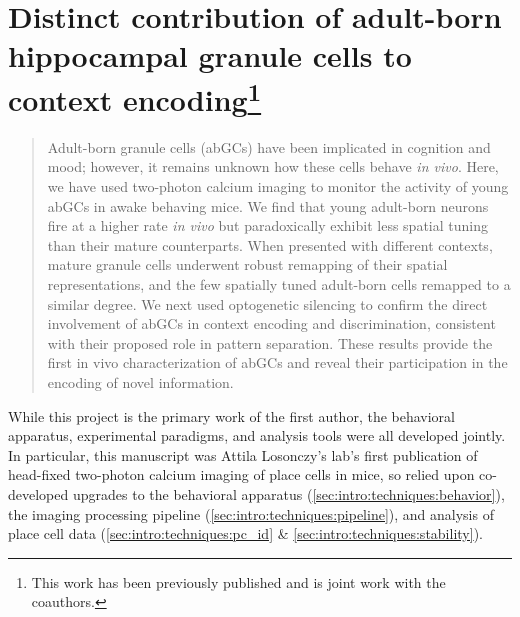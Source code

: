 \section[Distinct contribution of adult-born hippocampal granule cells to context encoding]{Distinct contribution of adult-born hippocampal granule cells to context encoding\footnote{This work has been previously published \citep{Danielson2016a} and is joint work with the coauthors.}}
\label{sec:other:DG}
\begin{quote}
Adult-born granule cells (abGCs) have been implicated in cognition and mood; however, it remains unknown how these cells behave \emph{in vivo}. Here, we have used two-photon calcium imaging to monitor the activity of young abGCs in awake behaving mice. We find that young adult-born neurons fire at a higher rate \emph{in vivo} but paradoxically exhibit less spatial tuning than their mature counterparts. When presented with different contexts, mature granule cells underwent robust remapping of their spatial representations, and the few spatially tuned adult-born cells remapped to a similar degree. We next used optogenetic silencing to confirm the direct involvement of abGCs in context encoding and discrimination, consistent with their proposed role in pattern separation. These results provide the first in vivo characterization of abGCs and reveal their participation in the encoding of novel information.
\end{quote}

While this project is the primary work of the first author, the behavioral apparatus, experimental paradigms, and analysis tools were all developed jointly.
In particular, this manuscript was Attila Losonczy's lab's first publication of head-fixed two-photon calcium imaging of place cells in mice, so relied upon co-developed upgrades to the behavioral apparatus (\autoref{sec:intro:techniques:behavior}), the imaging processing pipeline (\autoref{sec:intro:techniques:pipeline}), and analysis of place cell data (\autoref{sec:intro:techniques:pc_id} \& \autoref{sec:intro:techniques:stability}).


